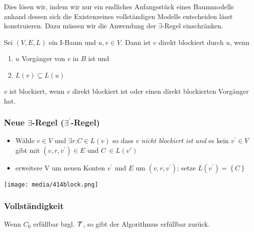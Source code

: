 Dies lösen wir, indem wir nur ein endliches Anfangsstück eines Baummodells anhand dessen sich die Existenzeines vollständigen Modells entscheiden lässt konstruieren. Dazu müssen wir die Anwendung der $\exists$-Regel einschränken.

\begin{definition}[Blockiert]

Sei $\left( V,E,L \right)$ ein I-Baum und $u,v \in V$. Dann ist
$v$ direkt blockiert durch $u$, wenn

\begin{enumerate}
\def\labelenumi{\arabic{enumi}.}
\item
  $u$ Vorgänger von $v$ in $B$ ist und
\item
  $L\left( v \right) \subseteq L\left( u \right)$
\end{enumerate}

$v$ ist blockiert, wenn $v$ direkt blockiert ist oder einen direkt
blockierten Vorgänger hat.
\end{definition}

\subsubsection{\texorpdfstring{Neue $\exists$-Regel
($\exists^{'}$-Regel)}{Neue \textbackslash{}exists-Regel (\textbackslash{}exists\^{}\{'\}-Regel)}}\label{neue-exists-regel-exists-regel}

\begin{itemize}
\item
  Wähle $v \in V$ und $\exists r.C \in L\left( v \right)$ so dass
  $v$ \emph{nicht blockiert ist und} es kein $v^{'} \in V$ gibt mit
  $\left( v,r,v^{'} \right) \in E$ und $C\  \in L\left( v' \right)$
\item
  erweitere V um neuen Konten $v^{'}$ und $E$ um
  $\left( v,r,v^{'} \right)$; setze
  $L\left( v^{'} \right) = \left\{ C \right\}$
\end{itemize}

\texttt{[image: media/414block.png]}

\subsubsection{Vollständigkeit}\label{vollstuxe4ndigkeit}

\begin{proposition}
Wenn $C_0$ erfüllbar bzgl. $\mathcal{T}$, so gibt der Algorithmus erfüllbar zurück.
\end{proposition}

